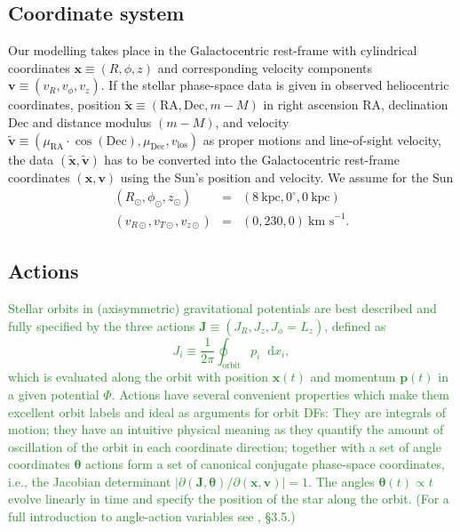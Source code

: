 \documentclass[iop,revtex4]{emulateapj}
\newcommand{\vect}[1]{\boldsymbol{#1}}
\newcommand*\diff{\mathop{}\!\mathrm{d}}
\newcommand{\NEW}[1]{\textcolor{ForestGreen}{#1}}
\begin{document}
\subsection{Coordinate system} \label{sec:coordinates}

Our modelling takes place in the Galactocentric rest-frame with cylindrical coordinates $\vect{x} \equiv (R,\phi,z)$ and corresponding velocity components $\vect{v} \equiv (v_R,v_\phi,v_z)$. If the stellar phase-space data is given in observed heliocentric coordinates, position $\tilde{\vect{x}} \equiv(\text{RA},\text{Dec},m-M)$ in right ascension RA, declination Dec and distance modulus $(m-M)$, and velocity $\tilde{\vect{v}} \equiv (\mu_\text{RA} \cdot \cos ( \text{Dec}),\mu_\text{Dec},v_\text{los})$ as proper motions and line-of-sight velocity, the data $(\tilde{\vect{x}},\tilde{\vect{v}})$ has to be converted into the Galactocentric rest-frame coordinates $(\vect{x},\vect{v})$ using the Sun's position and velocity. We assume for the Sun
\begin{eqnarray*}
(R_\odot,\phi_\odot,z_\odot) &=&(8~\text{kpc}, 0^\circ, 0~\text{kpc})\\
(v_{R\odot},v_{T\odot},v_{z\odot}) &=& (0,230,0)~\text{km s}^{-1}.
\end{eqnarray*}


\subsection{Actions}  


\NEW{Stellar orbits in (axisymmetric) gravitational potentials are best described and fully specified by the three actions $\vect{J} \equiv (J_R, J_z, J_\phi=L_z)$, defined as
\begin{equation}
J_i \equiv \frac{1}{2\pi} \oint_\text{orbit} p_i \diff x_i, \label{eq:action_general}
\end{equation}
which is evaluated along the orbit with position $\vect{x}(t)$ and momentum $\vect{p}(t)$ in a given potential $\Phi$. Actions have several convenient properties which make them excellent orbit labels and ideal as arguments for orbit DFs: They are integrals of motion; they have an intuitive physical meaning as they quantify the amount of oscillation of the orbit in each coordinate direction; together with a set of angle coordinates $\vect{\theta}$ actions form a set of canonical conjugate phase-space coordinates, i.e., the Jacobian determinant $\left| \partial(\vect{J},\vect{\theta}) / \partial (\vect{x},\vect{v}) \right|=1$. The angles $\vect{\theta}(t)\propto t$ evolve linearly in time and specify the position of the star along the orbit.  (For a full introduction to angle-action variables see \citealt{2008gady.book.....B}, \S 3.5.)}
\end{document}
